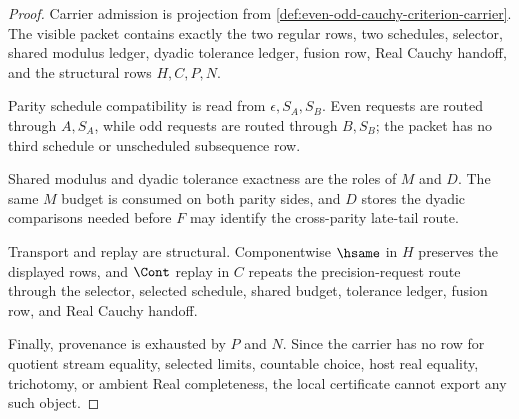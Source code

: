 \begin{proof}
Carrier admission is projection from \autoref{def:even-odd-cauchy-criterion-carrier}. The visible packet contains exactly the two regular rows, two schedules, selector, shared modulus ledger, dyadic tolerance ledger, fusion row, Real Cauchy handoff, and the structural rows $H,C,P,N$.

Parity schedule compatibility is read from $\epsilon,S_A,S_B$. Even requests are routed through $A,S_A$, while odd requests are routed through $B,S_B$; the packet has no third schedule or unscheduled subsequence row.

Shared modulus and dyadic tolerance exactness are the roles of $M$ and $D$. The same $M$ budget is consumed on both parity sides, and $D$ stores the dyadic comparisons needed before $F$ may identify the cross-parity late-tail route.

Transport and replay are structural. Componentwise $\hsame$ in $H$ preserves the displayed rows, and $\Cont$ replay in $C$ repeats the precision-request route through the selector, selected schedule, shared budget, tolerance ledger, fusion row, and Real Cauchy handoff.

Finally, provenance is exhausted by $P$ and $N$. Since the carrier has no row for quotient stream equality, selected limits, countable choice, host real equality, trichotomy, or ambient Real completeness, the local certificate cannot export any such object.
\end{proof}

